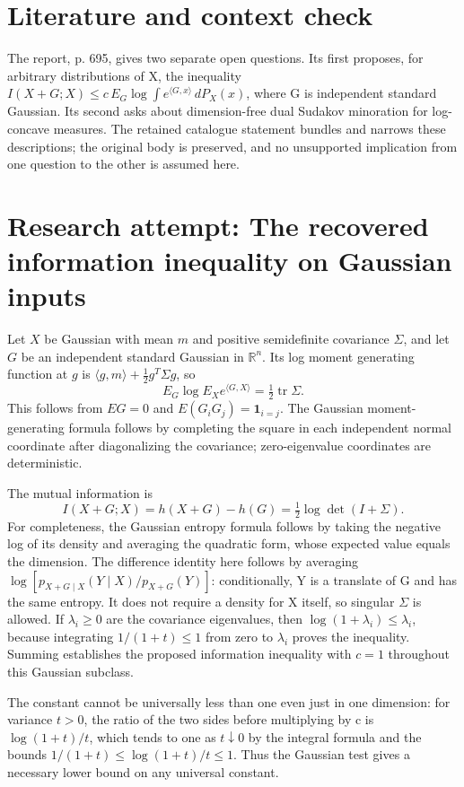 \documentclass[11pt]{article}
\begin{document}
\section{Literature and context check}
The report, p. 695, gives two separate open questions. Its first proposes, for arbitrary distributions of X, the inequality $I(X+G;X)\le c\,E_G\log\int e^{\langle G,x\rangle}\,dP_X(x)$, where G is independent standard Gaussian. Its second asks about dimension-free dual Sudakov minoration for log-concave measures. The retained catalogue statement bundles and narrows these descriptions; the original body is preserved, and no unsupported implication from one question to the other is assumed here.
\section{Research attempt: The recovered information inequality on Gaussian inputs}
Let $X$ be Gaussian with mean $m$ and positive semidefinite covariance $\Sigma$, and let $G$ be an independent standard Gaussian in $\mathbb R^n$. Its log moment generating function at $g$ is $\langle g,m\rangle+\tfrac12g^T\Sigma g$, so
\[
E_G\log E_X e^{\langle G,X\rangle}=\tfrac12\operatorname{tr}\Sigma.
\]
This follows from $EG=0$ and $E(G_iG_j)=\mathbf1_{i=j}$. The Gaussian moment-generating formula follows by completing the square in each independent normal coordinate after diagonalizing the covariance; zero-eigenvalue coordinates are deterministic.

The mutual information is
\[
I(X+G;X)=h(X+G)-h(G)=\tfrac12\log\det(I+\Sigma).
\]
For completeness, the Gaussian entropy formula follows by taking the negative log of its density and averaging the quadratic form, whose expected value equals the dimension. The difference identity here follows by averaging $\log[p_{X+G\mid X}(Y\mid X)/p_{X+G}(Y)]$: conditionally, Y is a translate of G and has the same entropy. It does not require a density for X itself, so singular $\Sigma$ is allowed. If $\lambda_i\ge0$ are the covariance eigenvalues, then $\log(1+\lambda_i)\le\lambda_i$, because integrating $1/(1+t)\le1$ from zero to $\lambda_i$ proves the inequality. Summing establishes the proposed information inequality with $c=1$ throughout this Gaussian subclass.

The constant cannot be universally less than one even just in one dimension: for variance $t>0$, the ratio of the two sides before multiplying by c is $\log(1+t)/t$, which tends to one as $t\downarrow0$ by the integral formula and the bounds $1/(1+t)\le\log(1+t)/t\le1$. Thus the Gaussian test gives a necessary lower bound on any universal constant.
\end{document}
